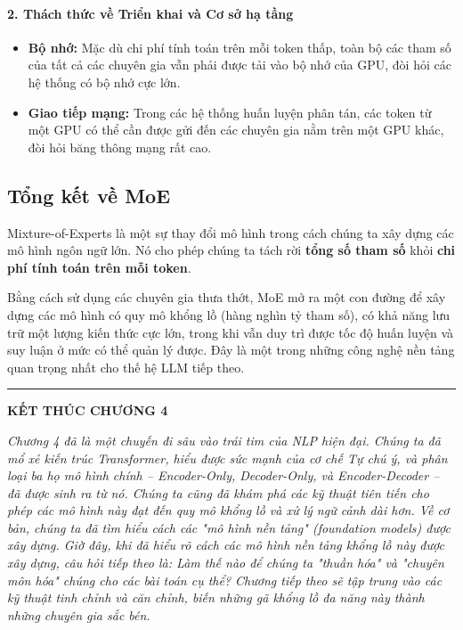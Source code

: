 \paragraph{2. Thách thức về Triển khai và Cơ sở hạ tầng}
\begin{itemize}
    \item \textbf{Bộ nhớ:} Mặc dù chi phí tính toán trên mỗi token thấp, toàn bộ các tham số của tất cả các chuyên gia vẫn phải được tải vào bộ nhớ của GPU, đòi hỏi các hệ thống có bộ nhớ cực lớn.
    \item \textbf{Giao tiếp mạng:} Trong các hệ thống huấn luyện phân tán, các token từ một GPU có thể cần được gửi đến các chuyên gia nằm trên một GPU khác, đòi hỏi băng thông mạng rất cao.
\end{itemize}

\subsection{Tổng kết về MoE}
Mixture-of-Experts là một sự thay đổi mô hình trong cách chúng ta xây dựng các mô hình ngôn ngữ lớn. Nó cho phép chúng ta tách rời \textbf{tổng số tham số} khỏi \textbf{chi phí tính toán trên mỗi token}.

Bằng cách sử dụng các chuyên gia thưa thớt, MoE mở ra một con đường để xây dựng các mô hình có quy mô khổng lồ (hàng nghìn tỷ tham số), có khả năng lưu trữ một lượng kiến thức cực lớn, trong khi vẫn duy trì được tốc độ huấn luyện và suy luận ở mức có thể quản lý được. Đây là một trong những công nghệ nền tảng quan trọng nhất cho thế hệ LLM tiếp theo.

\bigskip
\hrule
\bigskip

\begin{center}
    \textbf{\Large KẾT THÚC CHƯƠNG 4}
\end{center}

\textit{Chương 4 đã là một chuyến đi sâu vào trái tim của NLP hiện đại. Chúng ta đã mổ xẻ kiến trúc Transformer, hiểu được sức mạnh của cơ chế Tự chú ý, và phân loại ba họ mô hình chính -- Encoder-Only, Decoder-Only, và Encoder-Decoder -- đã được sinh ra từ nó. Chúng ta cũng đã khám phá các kỹ thuật tiên tiến cho phép các mô hình này đạt đến quy mô khổng lồ và xử lý ngữ cảnh dài hơn. Về cơ bản, chúng ta đã tìm hiểu cách các "mô hình nền tảng" (foundation models) được xây dựng. Giờ đây, khi đã hiểu rõ cách các mô hình nền tảng khổng lồ này được xây dựng, câu hỏi tiếp theo là: Làm thế nào để chúng ta "thuần hóa" và "chuyên môn hóa" chúng cho các bài toán cụ thể? Chương tiếp theo sẽ tập trung vào các kỹ thuật tinh chỉnh và căn chỉnh, biến những gã khổng lồ đa năng này thành những chuyên gia sắc bén.}
